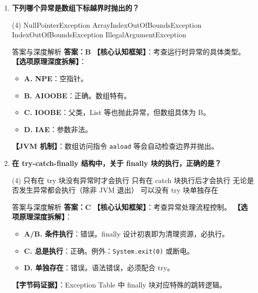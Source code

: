﻿\documentclass[12pt, a4paper]{ctexart}
\newcommand{\code}[1]{\texttt{#1}}
\begin{document}
\begin{enumerate}[label=\textbf{\arabic*.}, itemsep=1em]
	\item \textbf{下列哪个异常是数组下标越界时抛出的？}
	      \begin{tasks}(4)
		      \task NullPointerException \task ArrayIndexOutOfBoundsException
		      \task IndexOutOfBoundsException \task IllegalArgumentException
	      \end{tasks}
	      \begin{bluebox}{答案与深度解析}
		      \textbf{答案：B}
		      \textbf{【核心认知框架】}：考查运行时异常的具体类型。
		      \textbf{【选项原理深度拆解】}：
		      \begin{itemize}[leftmargin=*, nosep]
			      \item \textbf{A. NPE}：空指针。
			      \item \textbf{B. AIOOBE}：正确。数组特有。
			      \item \textbf{C. IOOBE}：父类，List 等也抛此异常，但数组具体为 B。
			      \item \textbf{D. IAE}：参数非法。
		      \end{itemize}
		      \textbf{【JVM 机制】}：数组访问指令 \code{aaload} 等会自动检查边界并抛出。
	      \end{bluebox}

	\item \textbf{在 try-catch-finally 结构中，关于 finally 块的执行，正确的是？}
	      \begin{tasks}(4)
		      \task 只有在 try 块没有异常时才会执行 \task 只有在 catch 块执行后才会执行
		      \task 无论是否发生异常都会执行（除非 JVM 退出） \task 可以没有 try 块单独存在
	      \end{tasks}
	      \begin{bluebox}{答案与深度解析}
		      \textbf{答案：C}
		      \textbf{【核心认知框架】}：考查异常处理流程控制。
		      \textbf{【选项原理深度拆解】}：
		      \begin{itemize}[leftmargin=*, nosep]
			      \item \textbf{A/B. 条件执行}：错误。finally 设计初衷即为清理资源，必执行。
			      \item \textbf{C. 总是执行}：正确。例外：\code{System.exit(0)} 或断电。
			      \item \textbf{D. 单独存在}：错误。语法错误，必须配合 try。
		      \end{itemize}
		      \textbf{【字节码证据】}：Exception Table 中 finally 块对应特殊的跳转逻辑。
	      \end{bluebox}


\end{enumerate}
\end{document}
